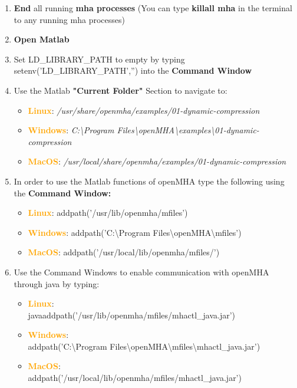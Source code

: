 \documentclass[11pt,a4paper,twoside]{article}
\newcommand{\+}{\discretionary{\mbox{\scriptsize$\hookleftarrow$}}{}{}}
\begin{document}
{{{\begin{enumerate}
\item \textbf{End} all running \textbf{mha processes} (You can type \textbf{killall mha} in the terminal to any running mha processes)
\item \textbf{Open Matlab}
\item Set LD\_LIBRARY\_PATH to empty by typing {\ttfamily setenv('LD\_LIBRARY\_PATH','')} into the \textbf{Command Window}
\item Use the Matlab \textbf{"Current Folder"} Section to navigate to:

\begin{itemize}
\item \textcolor{orange}{\textbf{Linux}}: \textit{/usr/share/openmha/examples/01-dynamic-compression} 
\item \textcolor{orange}{\textbf{Windows}}: \textit{C:\textbackslash Program Files\textbackslash openMHA\textbackslash examples\textbackslash 01-dynamic-compression}
\item \textcolor{orange}{\textbf{MacOS}}: \textit{/usr/local/share/openmha/examples/01-dynamic-compression} 
\end{itemize}

\item In order to use the Matlab functions of openMHA type the following using the \textbf{Command Window:} 

\begin{itemize}
\item \textcolor{orange}{\textbf{Linux}}: {\ttfamily addpath('/usr/lib/openmha/mfiles')}
\item \textcolor{orange}{\textbf{Windows}}: {\ttfamily addpath('C:\textbackslash Program Files\textbackslash openMHA\textbackslash mfiles')}
\item \textcolor{orange}{\textbf{MacOS}}: {\ttfamily addpath('/usr/local/lib/openmha/mfiles/')}
\end{itemize}


\item Use the Command Windows to enable communication with openMHA through java by typing: 

\begin{itemize}
\item \textcolor{orange}{\textbf{Linux}}: \\{\ttfamily javaaddpath('/usr/lib/openmha/mfiles/mhactl\_java.jar')} 
\item \textcolor{orange}{\textbf{Windows}}: \\ {\ttfamily addpath('C:\textbackslash Program Files\textbackslash openMHA\textbackslash mfiles\textbackslash mhactl\_java.jar')}
\item \textcolor{orange}{\textbf{MacOS}}: \\ {\ttfamily addpath('/usr/local/lib/openmha/mfiles/mhactl\_java.jar')}
\end{itemize}


\end{enumerate}}}}
\end{document}
